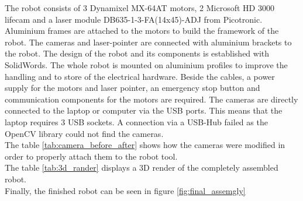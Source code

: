 \documentclass[./\jobname.tex]{subfiles}
\begin{document}
The robot consists of 3 Dynamixel MX-64AT motors, 2 Microsoft HD 3000 lifecam and a laser module DB635-1-3-FA(14x45)-ADJ from Picotronic. Aluminium frames are attached to the motors to build the framework of the robot. The cameras and laser-pointer are connected with aluminium brackets to the robot. The design of the robot and its components is established with SolidWords. The whole robot is mounted on aluminium profiles to improve the handling and to store of the electrical hardware. Beside the cables, a power supply for the motors and laser pointer, an emergency stop button and communication components for the motors are required. The cameras are directly connected to the laptop or computer via the USB ports. This means that the laptop requires 3 USB sockets. A connection via a USB-Hub failed as the OpenCV library could not find the cameras. \\
The table \ref{tab:camera_before_after} shows how the cameras were modified in order to properly attach them to the robot tool. \\
The table \ref{tab:3d_rander} displays a 3D render of the completely assembled robot.\\
Finally, the finished robot can be seen in figure \ref{fig:final_assemgly}

\begin{table}[H]
	\centering
	\noindent{}
	\label{tab:camera_before_after}
\end{table}
\end{document}
